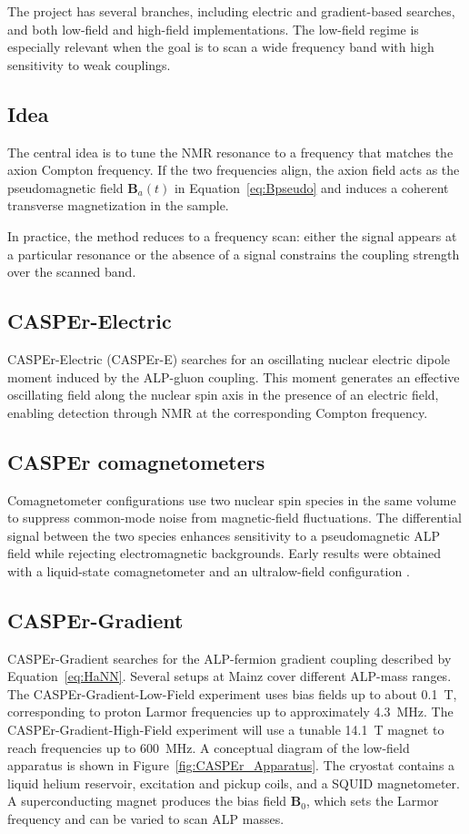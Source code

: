 The project has several branches, including electric and gradient-based searches, and both low-field and high-field implementations.
The low-field regime is especially relevant when the goal is to scan a wide frequency band with high sensitivity to weak couplings.

\subsection{Idea}
The central idea is to tune the NMR resonance to a frequency that matches the axion Compton frequency.
If the two frequencies align, the axion field acts as the pseudomagnetic field $\mathbf{B}_a(t)$ in Equation~\eqref{eq:Bpseudo} and induces a coherent transverse magnetization in the sample.

In practice, the method reduces to a frequency scan: either the signal appears at a particular resonance or the absence of a signal constrains the coupling strength over the scanned band.

\subsection{CASPEr-Electric}

CASPEr-Electric (CASPEr-E) searches for an oscillating nuclear electric dipole moment induced by the ALP-gluon coupling.
This moment generates an effective oscillating field along the nuclear spin axis in the presence of an electric field, enabling detection through NMR at the corresponding Compton frequency.

\subsection{CASPEr comagnetometers}
Comagnetometer configurations use two nuclear spin species in the same volume to suppress common-mode noise from magnetic-field fluctuations.
The differential signal between the two species enhances sensitivity to a pseudomagnetic ALP field while rejecting electromagnetic backgrounds.
Early results were obtained with a liquid-state comagnetometer \cite{PhysRevLett.122.191302} and an ultralow-field configuration \cite{CASPEr_ZULF_2019}.

\subsection{CASPEr-Gradient}\label{sec:intro:CASPEr:gradient}
CASPEr-Gradient searches for the ALP-fermion gradient coupling described by Equation~\eqref{eq:HaNN}.
Several setups at Mainz cover different ALP-mass ranges.
The CASPEr-Gradient-Low-Field experiment uses bias fields up to about \SI{0.1}{\tesla}, corresponding to proton Larmor frequencies up to approximately \SI{4.3}{\MHz}.
The CASPEr-Gradient-High-Field experiment will use a tunable \SI{14.1}{\tesla} magnet to reach frequencies up to \SI{600}{\MHz}.
A conceptual diagram of the low-field apparatus is shown in Figure~\ref{fig:CASPEr_Apparatus}.
The cryostat contains a liquid helium reservoir, excitation and pickup coils, and a SQUID magnetometer.
A superconducting magnet produces the bias field $\mathbf{B}_0$, which sets the Larmor frequency and can be varied to scan ALP masses.

